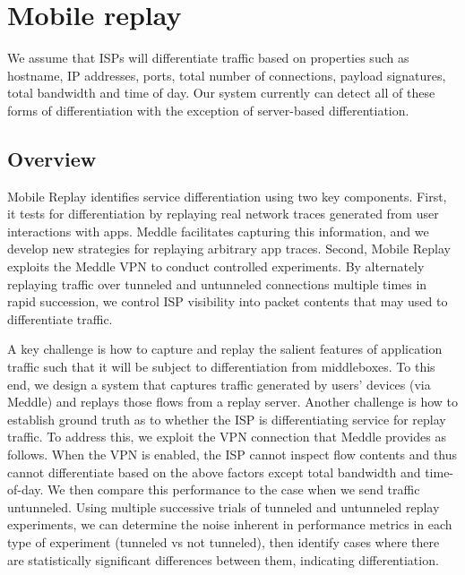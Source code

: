 \documentclass[letterpaper]{sig-alternate-2013}
\begin{document}
\section{Mobile replay}
\label{sec:method}

We assume that ISPs will differentiate traffic based on properties such as hostname, IP addresses, ports, total number of connections, payload signatures, total bandwidth and time of day. Our system currently can detect all of these forms of differentiation with the exception of server-based differentiation.

\subsection{Overview} Mobile Replay identifies service differentiation using two key components. First, it tests for differentiation by replaying real network traces generated from user interactions with apps. Meddle \cite{meddle} facilitates capturing this information, and we develop new strategies for replaying arbitrary app traces. Second, Mobile Replay exploits the Meddle VPN to conduct controlled experiments. By alternately replaying traffic over tunneled and untunneled connections multiple times in rapid succession, we control ISP visibility into packet contents that may used to differentiate traffic.

A key challenge is how to capture and replay the salient features of application traffic such that it will be subject to differentiation from middleboxes. To this end, we design a system that captures traffic generated by users' devices (via Meddle) and replays those flows from a replay server. Another challenge is how to establish ground truth as to whether the ISP is differentiating service for replay traffic. To address this, we exploit the VPN connection that Meddle provides as follows. When the VPN is enabled, the ISP cannot inspect flow contents and thus cannot differentiate based on the above factors except total bandwidth and time-of-day. We then compare this performance to the case when we send traffic untunneled. Using multiple successive trials of tunneled and untunneled replay experiments, we can determine the noise inherent in performance metrics in each type of experiment (tunneled vs not tunneled), then identify cases where there are statistically significant differences between them, indicating differentiation.
\end{document}
